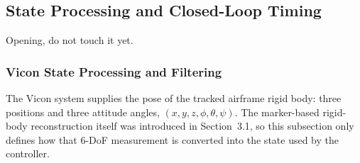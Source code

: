 \subsection{State Processing and Closed-Loop Timing}\label{sec:3.3}

Opening, do not touch it yet.

\subsubsection{Vicon State Processing and Filtering}\label{sec:3.3.1}

The Vicon system supplies the pose of the tracked airframe rigid body: three
positions and three attitude angles, \((x,y,z,\phi,\theta,\psi)\). The
marker-based rigid-body reconstruction itself was introduced in Section~3.1, so
this subsection only defines how that 6-DoF measurement is converted into the
state used by the controller.

